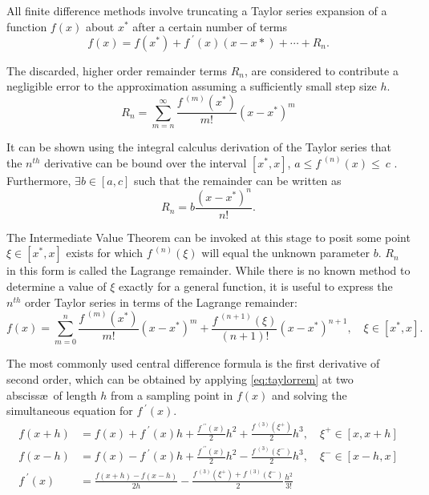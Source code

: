 All finite difference methods involve truncating a Taylor series expansion of a function $f(x)$ about $x^*$ after a certain number of terms
\begin{equation}
    f(x) = f(x^*) + f^{\;\prime}(x)(x-x*) + \cdots + R_n.
\end{equation}

The discarded, higher order remainder terms $R_n$, are considered to contribute a negligible error to the approximation assuming a sufficiently small step size $h$.
\begin{equation}
    R_n = \sum_{m=n}^\infty \frac{f^{\;(m)}(x^*)}{m!}(x-x^*)^m
\end{equation}

It can be shown using the integral calculus derivation of the Taylor series that the $n^{th}$ derivative can be bound over the interval $[x^*, x]$, \ie $a\leq f^{\;(n)}(x) \leq~c$ \cite{Greenberg1978}.
Furthermore, $\exists b \in [a,c]$ such that the remainder can be written as
\begin{equation}
   R_n = b \frac{(x-x^*)^n}{n!}.
\end{equation}

The Intermediate Value Theorem can be invoked at this stage to posit some point $\xi \in [x^*,x]$ exists for which $f^{\;(n)}(\xi)$ will equal the unknown parameter $b$.
$R_n$ in this form is called the Lagrange remainder.
While there is no known method to determine a value of $\xi$ exactly for a general function, it is useful to express the $n^{th}$ order Taylor series in terms of the Lagrange remainder:
\begin{equation}
    f(x) = \sum_{m=0}^n \frac{f^{\;(m)}(x^*)}{m!}(x-x^*)^m + \frac{f^{\;(n+1)}(\xi)}{(n+1)!}(x-x^*)^{n+1}, \quad \xi \in [x^*,x].\label{eq:taylorrem}
\end{equation}

The most commonly used central difference formula is the first derivative of second order, which can be obtained by applying \cref{eq:taylorrem} at two absciss\ae\ of length $h$ from a sampling point in $f(x)$ and solving the simultaneous equation for $f^{\;\prime}(x)$.
\begin{align}
f(x+h) &= f(x) + f^{\;\prime}(x)h + \frac{f^{\;\prime\prime}(x)}{2}h^2 + \frac{f^{\;(3)}(\xi^+)}{2}h^3, \quad \xi^+ \in [x,x+h] \\
f(x-h) &= f(x) - f^{\;\prime}(x)h + \frac{f^{\;\prime\prime}(x)}{2}h^2 - \frac{f^{\;(3)}(\xi^-)}{2}h^3, \quad \xi^- \in [x-h,x] \\
f^{\;\prime}(x) &= \frac{f(x+h)-f(x-h)}{2h} - \frac{f^{\;(3)}(\xi^+)+f^{\;(3)}(\xi^-)}{2}\frac{h^2}{3!}\label{eq:cd12pm}
\end{align}

